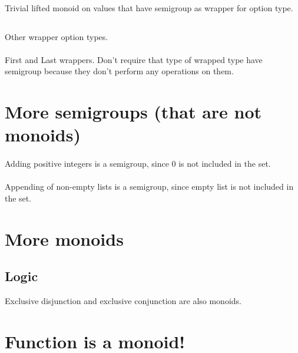 \documentclass{article}
\begin{document}
    \paragraph{} 
    Trivial lifted monoid on values that have semigroup as wrapper for option type.

    \subsection{}
    Other wrapper option types.

    \paragraph{}
    First and Last wrappers. Don't require that type of wrapped type have semigroup because they don't perform any operations on them.



    \section{More semigroups (that are not monoids)}

    \paragraph{}
    Adding positive integers is a semigroup, since $0$ is not included in the set.

    \paragraph{}
    Appending of non-empty lists is a semigroup, since empty list is not included in the set.

    \section{More monoids}

    \subsection{Logic}

    Exclusive disjunction and exclusive conjunction are also monoids.

    \newpage

    \section{Function is a monoid!}
\end{document}
